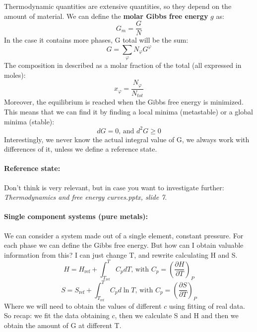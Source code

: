 Thermodynamic quantities are extensive quantities, so they depend on the amount of material. We can define the \textbf{molar Gibbs free energy} $g$ as:
\begin{equation}
    G_{m} = \frac{G}{N}
\end{equation}
In the case it contains more phases, G total will be the sum:
\begin{equation}
    G = \sum_{\varphi} N_{\varphi}G^{\varphi}
\end{equation}
The composition in described as a molar fraction of the total (all expressed in moles):
\begin{equation}
    x_{\varphi} = \frac{N_{\varphi}}{N_{tot}}
\end{equation}
Moreover, the equilibrium is reached when the Gibbs free energy is minimized. This means that we can find it by finding a local minima (metastable) or a global minima (stable):
\begin{equation}
    dG = 0 \text{, and } d^2G \geq 0
\end{equation}
Interestingly, we never know the actual integral value of G, we always work with differences of it, unless we define a reference state.

\paragraph{Reference state:} Don't think is very relevant, but in case you want to investigate further: \textit{Thermodynamics and free energy curves.pptx, slide 7}.

\paragraph{Single component systems (pure metals):} We can consider a system made out of a single element, constant pressure. For each phase we can define the Gibbs free energy. But how can I obtain valuable information from this? I can just change T, and rewrite calculating H and S.
\begin{equation}
    H = H_{\text{ref}} + \int_{T_{\text{ref}}}^{T} C_{p}dT \text{, with } C_p = \left(\frac{\partial H}{\partial T}\right)_P
\end{equation}
\begin{equation}
    S = S_{\text{ref}} + \int_{T_{\text{ref}}}^{T} C_{p}d\ln T \text{, with } C_p = \left(\frac{\partial S}{\partial T}\right)_P 
\end{equation}
Where we will need to obtain the values of different $c$ using fitting of real data.
So recap: we fit the data obtaining $c$, then we calculate S and H and then we obtain the amount of G at different T.

